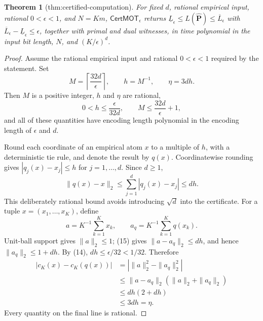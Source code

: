 \documentclass{article}
\newtheorem{theorem}{Theorem}
\begin{document}
\begin{theorem}[thm:certified-computation]\label{thm:certified-computation}
For fixed \(d\), rational empirical input, rational \(0<\epsilon<1\), and \(N=Km\), \(\mathsf{CertMOT}_\epsilon\) returns \(\underline L_\epsilon\le L(\widehat{\mathbf P})\le\overline L_\epsilon\) with \(\overline L_\epsilon-\underline L_\epsilon\le\epsilon\), together with primal and dual witnesses, in time polynomial in the input bit length, \(N\), and \((K/\epsilon)^d\).
\end{theorem}
\begin{proof}
Assume the rational empirical input and rational \(0<\epsilon<1\) required by the statement. Set
\[
M=\left\lceil\frac{32d}{\epsilon}\right\rceil,
\qquad h=M^{-1},
\qquad \eta=3dh.
\tag{13}
\]
Then \(M\) is a positive integer, \(h\) and \(\eta\) are rational,
\[
0<h\le\frac{\epsilon}{32d},
\qquad
M\le\frac{32d}{\epsilon}+1,
\tag{14}
\]
and all of these quantities have encoding length polynomial in the encoding length of \(\epsilon\) and \(d\).

Round each coordinate of an empirical atom \(x\) to a multiple of \(h\), with a deterministic tie rule, and denote the result by \(q(x)\). Coordinatewise rounding gives \(|q_j(x)-x_j|\le h\) for \(j=1,\ldots,d\). Since \(d\ge1\),
\[
\|q(x)-x\|_2
\le\sum_{j=1}^d|q_j(x)-x_j|
\le dh.
\tag{15}
\]
This deliberately rational bound avoids introducing \(\sqrt d\) into the certificate. For a tuple \(x=(x_1,\ldots,x_K)\), define
\[
a=K^{-1}\sum_{k=1}^Kx_k,
\qquad
a_q=K^{-1}\sum_{k=1}^Kq(x_k).
\]
Unit-ball support gives \(\|a\|_2\le1\); (15) gives \(\|a-a_q\|_2\le dh\), and hence \(\|a_q\|_2\le1+dh\). By (14), \(dh\le\epsilon/32<1/32\). Therefore
\[
\begin{aligned}
|c_K(x)-c_K(q(x))|
&=|\|a\|_2^2-\|a_q\|_2^2|\\
&\le\|a-a_q\|_2(\|a\|_2+\|a_q\|_2)\\
&\le dh(2+dh)\\
&\le3dh=\eta.
\end{aligned}
\tag{16}
\]
Every quantity on the final line is rational.


\end{proof}
\end{document}
